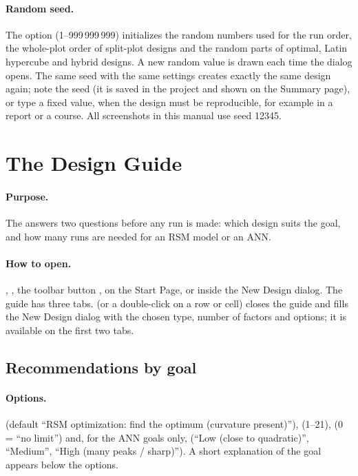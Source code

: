 \paragraph{Random seed.} The option  (1--999\,999\,999) initializes the random numbers used for the
run order, the whole-plot order of split-plot designs and the random parts of optimal, Latin hypercube and hybrid
designs. A new random value is drawn each time the dialog opens. The same seed with the same settings creates
exactly the same design again; note the seed (it is saved in the project and shown on the Summary page), or type a
fixed value, when the design must be reproducible, for example in a report or a course. All screenshots in this
manual use seed 12345.

\section{The Design Guide}
\label{sec:ch03-guide}

\paragraph{Purpose.} The  answers two questions before any run is made: which design suits the
goal, and how many runs are needed for an RSM model or an ANN.

\paragraph{How to open.} , , the toolbar button ,  on the Start Page, or
 inside the New Design dialog. The guide has three tabs.  (or a
double-click on a row or cell) closes the guide and fills the New Design dialog with the chosen type, number of
factors and options; it is available on the first two tabs.

\subsection{Recommendations by goal}
\label{sec:ch03-guide-goal}
\paragraph{Options.}  (default ``RSM optimization: find the optimum (curvature present)''),
 (1--21),  (0 = ``no limit'') and, for the ANN goals only,
 (``Low (close to quadratic)'', ``Medium'', ``High (many peaks / sharp)''). A short explanation
of the goal appears below the options.


